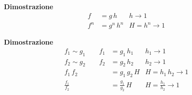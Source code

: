 \documentclass[../../dimostrazioni]{subfiles}
\begin{document}
            \begin{description}[style=nextline]
                \item[Se \(f \sim g\) allora \(f^n \sim g^n \quad \text{\emph{dove }} n \neq 0\)]
                    \textbf{Dimostrazione}
                    \begin{align*}
                        f &= g \, h & h \to 1\\
                        f^n &= g^n \, h^n & H = h^n \to 1
                    \end{align*} 
                \item[Se \(f_1 \sim g_1\) e \(f_2 \sim g_2\) allora \(f_1 \, f_2 \sim g_1 \, g_2\) e \(\frac{f_1}{f_2} \sim \frac{g_1}{g_2}\)] 
                    \textbf{Dimostrazione}
                    \begin{align*}
                        f_1 \sim g_1 \qquad f_1 &= g_1 \, h_1 & h_1 \to 1\\
                        f_2 \sim g_2 \qquad f_2 &= g_2 \, h_2 & h_2 \to 1\\
                        f_1 \, f_2 &= g_1 \, g_2 \, H & H = h_1 \, h_2 \to 1\\
                        \frac{f_1}{f_2} &= \frac{g_1}{g_2} \, H & H = \frac{h_1}{h_2} \to 1
                    \end{align*}
            \end{description}
            
\end{document}

